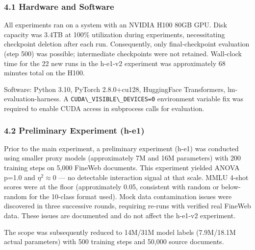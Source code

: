 
\subsubsection{4.1 Hardware and Software}

All experiments ran on a system with an NVIDIA H100 80GB GPU. Disk capacity was 3.4TB at 100\% utilization during experiments, necessitating checkpoint deletion after each run. Consequently, only final-checkpoint evaluation (step 500) was possible; intermediate checkpoints were not retained. Wall-clock time for the 22 new runs in the h-e1-v2 experiment was approximately 68 minutes total on the H100.

Software: Python 3.10, PyTorch 2.8.0+cu128, HuggingFace Transformers, lm-evaluation-harness. A \texttt{CUDA\textbackslash \_VISIBLE\textbackslash \_DEVICES=0} environment variable fix was required to enable CUDA access in subprocess calls for evaluation.

\subsubsection{4.2 Preliminary Experiment (h-e1)}

Prior to the main experiment, a preliminary experiment (h-e1) was conducted using smaller proxy models (approximately 7M and 16M parameters) with 200 training steps on 5,000 FineWeb documents. This experiment yielded ANOVA p=1.0 and $\eta^{2}\approx 0$ --- no detectable interaction signal at that scale. MMLU 4-shot scores were at the floor (approximately 0.05, consistent with random or below-random for the 10-class format used). Mock data contamination issues were discovered in three successive rounds, requiring re-runs with verified real FineWeb data. These issues are documented and do not affect the h-e1-v2 experiment.

The scope was subsequently reduced to 14M/31M model labels (7.9M/18.1M actual parameters) with 500 training steps and 50,000 source documents.
